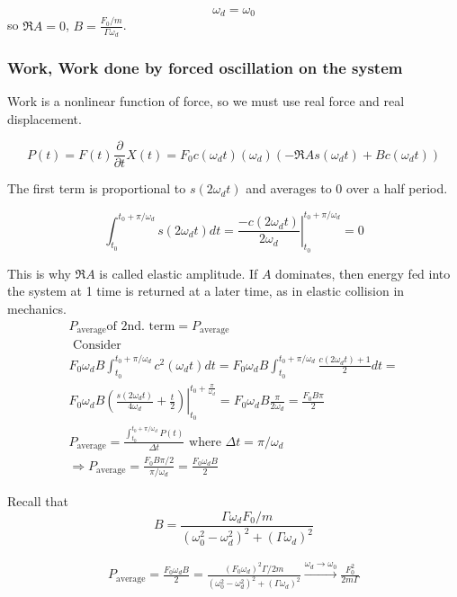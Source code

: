 \[
\omega_d = \omega_0
\]
so $\Re{A} = 0$, $B = \frac{ F_0 / m}{ \Gamma \omega_d}$.

\subsubsection{Work, Work done by forced oscillation on the system}

Work is a nonlinear function of force, so we must use real force and real displacement.

\[
P(t) = F(t) \frac{\partial }{\partial t} X(t) = F_0 c(\omega_d t) (\omega_d) (-\Re{A} s(\omega_d t) + B c(\omega_d t))
\]

The first term is proportional to $s(2\omega_d t)$ and averages to 0 over a half period.

\[
\int_{t_0}^{t_0 + \pi / \omega_d} s(2\omega_d t) dt = \left. \frac{ -c(2\omega_d t) }{2 \omega_d } \right|_{t_0}^{t_0 + \pi /\omega_d} = 0
\]

This is why $\Re{A}$ is called elastic amplitude. If $A$ dominates, then energy fed into the system at 1 time is returned at a later time, as in elastic collision in mechanics.
\[
\begin{gathered}
	P_{\text{average}} \text{of 2nd. term} = P_{\text{average}} \\
	\text{ Consider } \\
	F_0 \omega_d B \int_{t_0}^{t_0 + \pi/ \omega_d} c^2 (\omega_d t) dt = F_0 \omega_d B \int_{t_0}^{t_0 + \pi/ \omega_d} \frac{ c(2\omega_d t) + 1}{2} dt = \\
	F_0 \omega_d B \left. \left( \frac{ s(2\omega_d t) }{ 4 \omega_d } + \frac{t}{2} \right) \right|_{t_0}^{t_0 + \frac{\pi}{\omega_d} } = F_0 \omega_d B \frac{\pi}{2\omega_d} = \frac{F_0 B\pi}{2} \\
	P_{\text{average}} = \frac{ \int_{t_0}^{t_0 + \pi / \omega_d} P(t) }{ \Delta t}  \text{ where } \Delta t = \pi / \omega_d \\
	\Longrightarrow P_{\text{average}} = \frac{ F_0 B\pi /2}{ \pi / \omega_d}  = \boxed{ \frac{F_0 \omega_d B}{2} }
\end{gathered}
\]

Recall that
\[
B = \frac{ \Gamma \omega_d F_0 /m }{ (\omega_0^2 - \omega_d^2)^2 + (\Gamma \omega_d)^2 }
\]

\[
\begin{gathered}
	P_{\text{average}} = \frac{F_0 \omega_d B}{2} = \frac{ (F_0 \omega_d)^2 \Gamma /2m }{ (\omega_0^2 - \omega_d^2)^2 + (\Gamma \omega_d)^2 } \xrightarrow{ \omega_d\to \omega_0} \frac{F_0^2}{ 2m \Gamma}
\end{gathered}
\]

